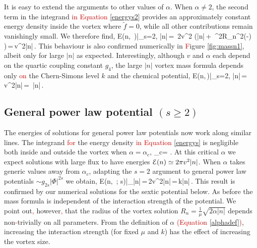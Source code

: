 It is easy to extend the arguments to  other values of $\alpha$. When $\alpha\neq 2$, the second term in the integrand \textcolor{red}{in Equation} \eqref{energys2} provides an approximately constant energy density inside the vortex where $\tilde f=0$, while all other contributions remain vanishingly small. We therefore find,
\be
{\cal E}(n, \,\alpha)\big|_{s=2, |n|}\,=\, 2\pi v^2 \left(|n|\,+\, \mu^2R_n^2\left(-\right) \right)\,=\,\alpha\pi v^2|n|\,.
\ee
This behaviour is also confirmed numerically in \textcolor{red}{F}igure \ref{fig:massn1}, albeit only for large $|n|$ as expected. Interestingly, although $v$ and $\alpha$ each  depend on the quartic coupling constant $g_4$, the large $|n|$ vortex mass formula depends only \textcolor{red}{on} the Chern-Simons level $k$ and the chemical potential,
\be
{\cal E}(n,\,\alpha)\big|_{s=2, |n|}\,=\,\alpha\pi v^2|n|\,=\, |n|\,.
\ee

\subsection{General power law potential $(s\geq 2)$}
 The energies of solutions for general power law potentials now work along similar lines.  The integrand \textcolor{red}{for} the energy density \textcolor{red}{in Equation} \eqref{energys} is negligible both inside and outside the vortex when $\alpha=\alpha_c$,
 \be
 \alpha_c= .
 \ee 
 At this critical  $\alpha$ we expect solutions with large flux to have energies ${\cal E}(n)\simeq 2\pi v^2 |n|$. When $\alpha$ takes generic values away from  $\alpha_c$, adapting the $s=2$ argument to general power law potentials $\sim g_{2s}|\Phi|^{2s}$  we obtain,
 \be
 {\cal E}(n, \,\alpha; s)\big|_{|n|}\,=\,2\alpha\pi v^2|n|\,=\,k\mu|n|\,.\label{generalenergy}
 \ee
This result is confirmed by our numerical solutions for the sextic potential below. As before the mass formula is independent of the interaction strength of the potential. We point out\textcolor{red}{,} however\textcolor{red}{,} that the radius of the vortex solution $R_n=\frac{1}{\mu}\sqrt{2\alpha |n|}$ depends non\textcolor{red}{-}trivially on all parameters. From the definition of $\alpha$ \textcolor{red}{(Equation }\eqref{alphadef}\textcolor{red}{)}, increasing the interaction strength (for fixed $\mu$ and $k$) has the effect of increasing the vortex size.

